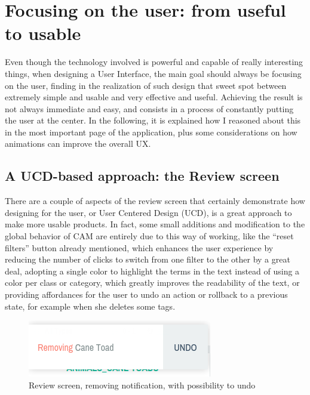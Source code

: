 \documentclass[12pt,svgnames]{memoir}
\begin{document}
\chapter{Focusing on the user: from useful to
usable}\label{focusing-on-the-user-from-useful-to-usable}

Even though the technology involved is powerful and capable of really
interesting things, when designing a User Interface, the main goal
should always be focusing on the user, finding in the realization of
such design that sweet spot between extremely simple and usable and very
effective and useful. Achieving the result is not always immediate and
easy, and consists in a process of constantly putting the user at the
center. In the following, it is explained how I reasoned about this in
the most important page of the application, plus some considerations on
how animations can improve the overall UX.

\section{A UCD-based approach: the Review
screen}\label{a-ucd-based-approach-the-review-screen}

There are a couple of aspects of the review screen that certainly
demonstrate how designing for the user, or User Centered Design (UCD),
is a great approach to make more usable products. In fact, some small
additions and modification to the global behavior of CAM are entirely
due to this way of working, like the ``reset filters'' button already
mentioned, which enhances the user experience by reducing the number of
clicks to switch from one filter to the other by a great deal, adopting
a single color to highlight the terms in the text instead of using a
color per class or category, which greatly improves the readability of
the text, or providing affordances for the user to undo an action or
rollback to a previous state, for example when she deletes some tags.

\begin{figure}[htbp]
\centering
\includegraphics{./src/img/review-notification.png}
\caption{Review screen, removing notification, with possibility to undo}
\end{figure}
\end{document}
